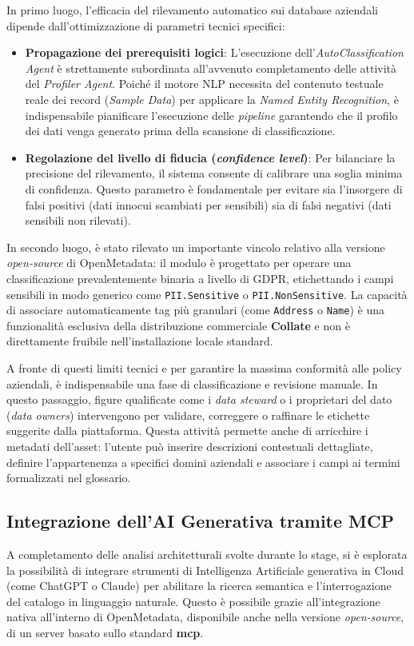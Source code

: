 In primo luogo, l'efficacia del rilevamento automatico sui database aziendali dipende dall'ottimizzazione di parametri tecnici specifici:
\begin{itemize}
    \item \textbf{Propagazione dei prerequisiti logici}: L'esecuzione dell'\emph{AutoClassification Agent} è strettamente subordinata all'avvenuto completamento delle attività del \emph{Profiler Agent}. Poiché il motore NLP necessita del contenuto testuale reale dei record (\emph{Sample Data}) per applicare la \emph{Named Entity Recognition}, è indispensabile pianificare l'esecuzione delle \emph{pipeline} garantendo che il profilo dei dati venga generato prima della scansione di classificazione.
    \item \textbf{Regolazione del livello di fiducia (\emph{confidence level})}: Per bilanciare la precisione del rilevamento, il sistema consente di calibrare una soglia minima di confidenza. Questo parametro è fondamentale per evitare sia l'insorgere di falsi positivi (dati innocui scambiati per sensibili) sia di falsi negativi (dati sensibili non rilevati).
\end{itemize}

In secondo luogo, è stato rilevato un importante vincolo relativo alla versione \emph{open-source} di OpenMetadata: il modulo è progettato per operare una classificazione 
prevalentemente binaria a livello di GDPR, etichettando i campi sensibili in modo generico come \texttt{PII.Sensitive} o \texttt{PII.NonSensitive}. La capacità di associare 
automaticamente tag più granulari (come \texttt{Address} o \texttt{Name}) è una funzionalità esclusiva della distribuzione commerciale \textbf{Collate} e non è direttamente 
fruibile nell'installazione locale standard. 

A fronte di questi limiti tecnici e per garantire la massima conformità alle policy aziendali, è indispensabile una fase di classificazione e revisione manuale. 
In questo passaggio, figure qualificate come i \emph{data steward} o i proprietari del dato (\emph{data owners}) intervengono per validare, correggere o raffinare le 
etichette suggerite dalla piattaforma. Questa attività permette anche di arricchire i metadati dell'asset: l'utente può inserire descrizioni contestuali dettagliate, 
definire l'appartenenza a specifici domini aziendali e associare i campi ai termini formalizzati nel glossario.

\subsection{Integrazione dell'AI Generativa tramite MCP}
A completamento delle analisi architetturali svolte durante lo stage, si è esplorata la possibilità di integrare strumenti di Intelligenza Artificiale generativa 
in Cloud (come ChatGPT o Claude) per abilitare la ricerca semantica e l'interrogazione del catalogo in linguaggio naturale. Questo è possibile grazie all'integrazione 
nativa all'interno di OpenMetadata, disponibile anche nella versione \emph{open-source}, di un server basato sullo standard \textbf{\gls{mcp}}. 


